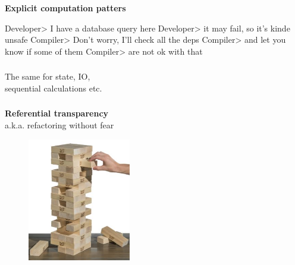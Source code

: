 \documentclass[usenames,dvipsnames, 18pt, compress, aspectratio=169]{beamer}
\begin{document}
\begin{frame}
    \frametitle{}
    \begin{center}
    \textbf{Explicit computation patters}

    \begin{flushleft}
        Developer> I have a database query here
        Developer> it may fail, so it's kinde unsafe
        Compiler> Don't worry, I'll check all the deps
        Compiler> and let you know if some of them
        Compiler> are not ok with that
    \end{flushleft}
    \end{center}
\end{frame}



\begin{frame}
    \frametitle{}
    \begin{center}
    The same for state, IO,\\ sequential calculations etc.
    \end{center}
\end{frame}

\begin{frame}
    \frametitle{}
    \begin{center}
    \textbf{Referential transparency}\\
    a.k.a. refactoring without fear

    \begin{figure}
        \includegraphics[width=0.4\textwidth,center]{giant-jenga.jpg}
    \end{figure}
    \end{center}
\end{frame}
\end{document}
